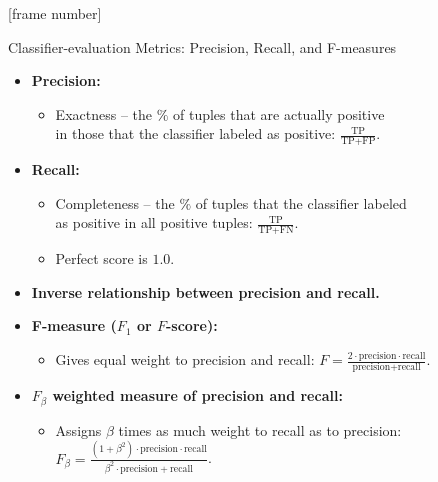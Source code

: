 \documentclass[aspectratio=169,t,table]{beamer}
\begin{document}
  {
    [frame number]
    \begin{frame}{Classifier-evaluation Metrics: Precision, Recall, and F-measures}
      \begin{itemize}
        \item \textbf{Precision:}
        \begin{itemize}
          \item Exactness -- the $\%$ of tuples that are actually positive \\
          in those that the classifier labeled as positive: $\frac{\text{TP}}{\text{TP} + \text{FP}}$.
        \end{itemize}
        \item \textbf{Recall:}
        \begin{itemize}
          \item Completeness -- the $\%$ of tuples that the classifier labeled \\
          as positive in all positive tuples: $\frac{\text{TP}}{\text{TP} + \text{FN}}$.
          \item Perfect score is $1.0$.
        \end{itemize}
        \item \textbf{Inverse relationship between precision and recall.}%
        \item \textbf{F-measure ($F_1$ or $F$-score):}
        \begin{itemize}
          \item Gives equal weight to precision and recall: $F = \frac{2\cdot\text{precision}\cdot \text{recall}}{\text{precision} + \text{recall}}$.
        \end{itemize}
        \item \textbf{$F_\beta$ weighted measure of precision and recall:}
        \begin{itemize}
          \item Assigns $\beta$ times as much weight to recall as to precision: $F_\beta = \frac{(1+\beta^2) \cdot \text{precision} \cdot \text{recall}}{\beta^2 \cdot \text{precision} + \text{recall}}$.
        \end{itemize}
      \end{itemize} %
    \end{frame}
  }
\end{document}

